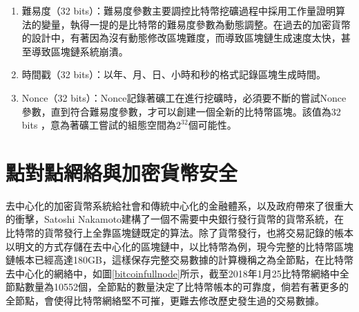 \begin{enumerate}
				

				\item 難易度（32 bits）：難易度參數主要調控比特幣挖礦過程中採用工作量證明算法的變量，執得一提的是比特幣的難易度參數為動態調整。在過去的加密貨幣的設計中，有著因為沒有動態修改區塊難度，而導致區塊鏈生成速度太快，甚至導致區塊鏈系統崩潰。
				\item 時間戳（32 bits）：以年、月、日、小時和秒的格式記錄區塊生成時間。
				\item Nonce（32 bits）：Nonce記錄著礦工在進行挖礦時，必須要不斷的嘗試Nonce參數，直到符合難易度參數，才可以創建一個全新的比特幣區塊。該值為32 bits ，意為著礦工嘗試的組態空間為$2^{32}$個可能性。
				\end{enumerate}
				

		\section{點對點網絡與加密貨幣安全}

		去中⼼化的加密貨幣系統給社會和傳統中⼼化的⾦融體系，以及政府帶來了很重⼤的衝擊，Satoshi Nakamoto建構了一個不需要中央銀行發行貨幣的貨幣系統，在比特幣的貨幣發行上全靠區塊鏈既定的算法。除了貨幣發行，也將交易記錄的帳本以明文的方式存儲在去中心化的區塊鏈中，以比特幣為例，現今完整的比特幣區塊鏈帳本已經高達180GB，這樣保存完整交易數據的計算機稱之為全節點，在比特幣去中心化的網絡中，如圖\ref{bitcoinfullnode}所示，截至2018年1月25比特幣網絡中全節點數量為10552個\supercite{bitcoinfullnode}，全節點的數量決定了比特幣帳本的可靠度，倘若有著更多的全節點，會使得比特幣網絡堅不可摧，更難去修改歷史發生過的交易數據。

